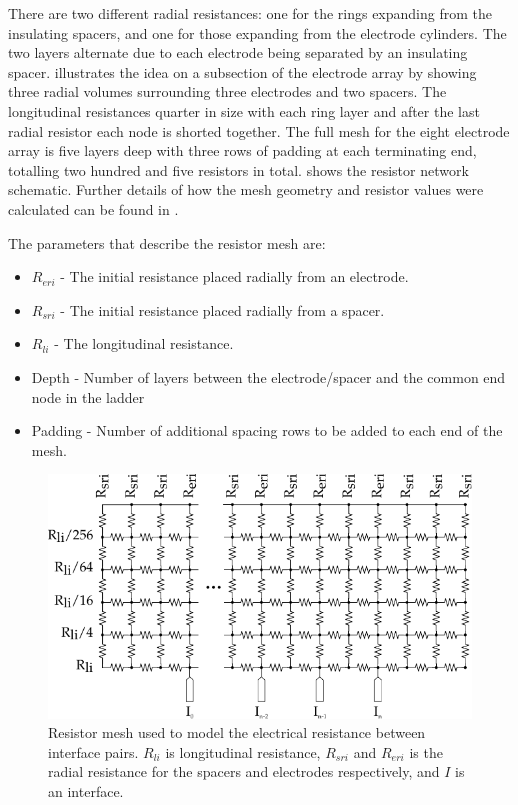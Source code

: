     There are two different radial resistances: one for the rings expanding from the insulating spacers, and one for those expanding from the electrode cylinders.
    The two layers alternate due to each electrode being separated by an insulating spacer.
     illustrates the idea on a subsection of the electrode array by showing three radial volumes surrounding three electrodes and two spacers.
    The longitudinal resistances quarter in size with each ring layer and after the last radial resistor each node is shorted together.
    The full mesh for the eight electrode array is five layers deep with three rows of padding at each terminating end, totalling two hundred and five resistors in total.
     shows the resistor network schematic.
    Further details of how the mesh geometry and resistor values were calculated can be found in \cite{Scott2014}.


    The parameters that describe the resistor mesh are:
    \begin{itemize}
    \item $R_{eri}$ - The initial resistance placed radially from an electrode.
    \item $R_{sri}$ - The initial resistance placed radially from a spacer.
    \item $R_{li}$ - The longitudinal resistance.
    \item Depth - Number of layers between the electrode/spacer and the common end node in the ladder
    \item Padding - Number of additional spacing rows to be added to each end of the mesh.
    \end{itemize}

    \begin{figure}
      \centering
      \includegraphics{content/pt2/07-InterfaceModel/graphics/resistorMesh}
      \caption{\label{fig:pt2-ResistorMesh}Resistor mesh used to model the electrical resistance between interface pairs. $R_{li}$ is longitudinal resistance, $R_{sri}$ and $R_{eri}$ is the radial resistance for the spacers and electrodes respectively, and $I$ is an interface.}
    \end{figure}


